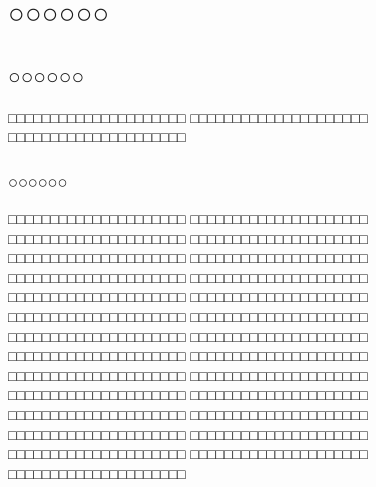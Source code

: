 \chapter{○○○○○○}
\section{○○○○○○}
□□□□□□□□□□□□□□□□□□□□□
□□□□□□□□□□□□□□□□□□□□□
□□□□□□□□□□□□□□□□□□□□□
\subsection{○○○○○○}
□□□□□□□□□□□□□□□□□□□□□
□□□□□□□□□□□□□□□□□□□□□
□□□□□□□□□□□□□□□□□□□□□
□□□□□□□□□□□□□□□□□□□□□
□□□□□□□□□□□□□□□□□□□□□
□□□□□□□□□□□□□□□□□□□□□
□□□□□□□□□□□□□□□□□□□□□
□□□□□□□□□□□□□□□□□□□□□
□□□□□□□□□□□□□□□□□□□□□
□□□□□□□□□□□□□□□□□□□□□
□□□□□□□□□□□□□□□□□□□□□
□□□□□□□□□□□□□□□□□□□□□
□□□□□□□□□□□□□□□□□□□□□
□□□□□□□□□□□□□□□□□□□□□
□□□□□□□□□□□□□□□□□□□□□
□□□□□□□□□□□□□□□□□□□□□
□□□□□□□□□□□□□□□□□□□□□
□□□□□□□□□□□□□□□□□□□□□
□□□□□□□□□□□□□□□□□□□□□
□□□□□□□□□□□□□□□□□□□□□
□□□□□□□□□□□□□□□□□□□□□
□□□□□□□□□□□□□□□□□□□□□
□□□□□□□□□□□□□□□□□□□□□
□□□□□□□□□□□□□□□□□□□□□
□□□□□□□□□□□□□□□□□□□□□
□□□□□□□□□□□□□□□□□□□□□
□□□□□□□□□□□□□□□□□□□□□
